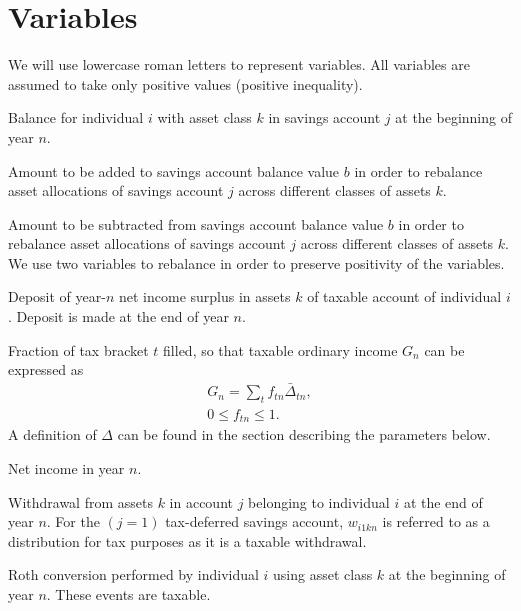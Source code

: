 \documentclass{article}[fleqn,12pt]
\begin{document}
\section{Variables}
We will use lowercase roman letters to represent variables. All variables are assumed
to take only positive values (positive inequality).
\begin{description}[leftmargin=4em,style=multiline]
\item [$b_{ijkn}$]
	Balance for individual $i$ with asset class $k$ in savings account $j$ at the beginning of year $n$.
\item [$b^+_{ijkn}$]
	Amount to be added to savings account balance value $b$ in order to rebalance asset allocations of
	savings account $j$ across different classes of assets $k$.
\item [$b^-_{ijkn}$]
	Amount to be subtracted from savings account balance value $b$ in order to rebalance asset allocations of
	savings account $j$ across different classes of assets $k$. We use two variables
	to rebalance in order to preserve positivity of the variables.
\item [$d_{ikn}$]
	Deposit of year-$n$ net income surplus in assets $k$ of taxable account of individual $i$.
	Deposit is made at the end of year $n$.
\item [$f_{t n}$]
	Fraction of tax bracket $t$ filled, so that taxable ordinary income $G_n$ can be expressed as
	\begin{eqnarray}
		\label{Eq:Tx1}
		G_n = \sum_t f_{t n}\bar{\Delta}_{t n},\\
		0 \leq f_{t n} \leq 1.
	\end{eqnarray}
	A definition of $\Delta$ can be found in the section describing the parameters below. 
\item [$g_n$]
	Net income in year $n$.
\item [$w_{ijkn}$]
	Withdrawal from assets $k$ in account $j$ belonging to individual $i$ at the end of year $n$.
	For the $(j=1)$ tax-deferred savings account, $w_{i1kn}$ is referred to as a distribution for
	tax purposes as it is a taxable withdrawal.
\item [$x_{ikn}$]
	Roth conversion performed by individual $i$ using asset class $k$ at the beginning of year $n$.
	These events are taxable.
\end{description}
\end{document}
